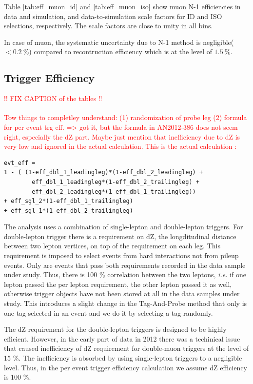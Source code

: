 Table \ref{tab:eff_muon_id} and \ref{tab:eff_muon_iso} show muon N-1 efficiencies in 
data and simulation, and data-to-simulation scale factors for ID and ISO selections, respectively. 
The scale factors are close to unity in all bins. 

In case of muon, the systematic uncertainty due to N-1 method is negligible($<0.2~\%$)
compared to recontruction efficiency which is at the level of $1.5~\%$. 

\subsection{Trigger Efficiency}
\label{subsec:trg_eff}
\textcolor{red}{!! FIX CAPTION of the tables !!} \\ \\   
\textcolor{red}{Tow things to completley understand: (1) randomization of probe leg 
(2) formula for per event trg eff. => got it, but the formula in AN2012-386 does not 
seem right, especially the dZ part. Maybe just mention that inefficiency due to dZ 
is very low and ignored in the actual calculation. This is the actual calculation : 
}
\begin{verbatim}
evt_eff = 
1 - ( (1-eff_dbl_1_leadingleg)*(1-eff_dbl_2_leadingleg) + 
        eff_dbl_1_leadingleg*(1-eff_dbl_2_trailingleg) + 
        eff_dbl_2_leadingleg*(1-eff_dbl_1_trailingleg))
+ eff_sgl_2*(1-eff_dbl_1_trailingleg)
+ eff_sgl_1*(1-eff_dbl_2_trailingleg)
\end{verbatim}
The analysis uses a combination of single-lepton and double-lepton triggers.
For double-lepton trigger there is a requirement on dZ, the longditudinal distance 
between two lepton vertices, on top of the requirement on each leg. 
This requirement is imposed to select events from hard interactions not 
from pileup events.
Only are events that pass both requirements recorded in the data sample under study. 
Thus, there is 100 \% correlation between the two leptons, \textit{i.e.} 
if one lepton passed the per lepton requirement, the other lepton passed it as well, 
otherwise trigger objects have not been stored at all in the data samples under study.  
This introduces a slight change in the Tag-And-Probe method that only is one 
tag selected in an event and we do it by selecting a tag randomly.

The dZ requirement for the double-lepton triggers is designed to be highly efficient. 
However, in the early part of data in 2012 there was a techinical issue that 
caused inefficiency of dZ requirement for double-muon triggers at the level of 15 \%.   
The inefficiency is absorbed by using single-lepton triggers to a negligible level. 
Thus, in the per event trigger efficiency calculation we assume dZ efficiency is 100 \%.

